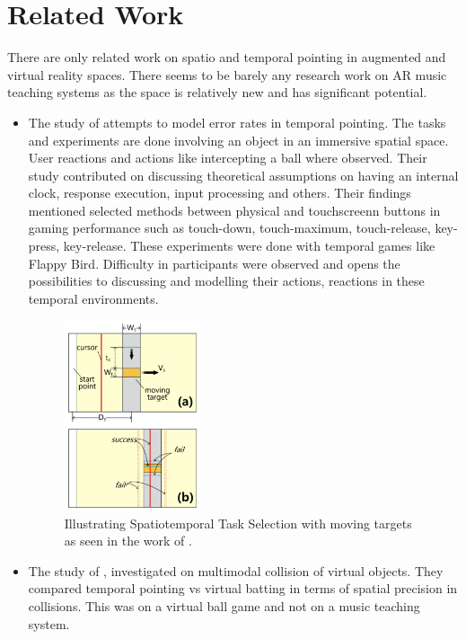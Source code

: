 \documentclass{article}
\begin{document}
\section{Related Work}
There are only related work on spatio and temporal pointing in augmented and virtual reality spaces. There seems to be barely any research work on AR music teaching systems as the space is relatively new and has significant potential.\\
\begin{itemize}
\item The study of \cite{lee2016modelling} attempts to model error rates in temporal pointing. The tasks and experiments are done involving an object in an immersive spatial space. User reactions and actions like intercepting a ball where observed. Their study contributed on discussing theoretical assumptions on having an internal clock, response execution, input processing and others. Their findings mentioned selected methods between physical and touchscreenn buttons in gaming performance such as touch-down, touch-maximum, touch-release, key-press, key-release. These experiments were done with temporal games like Flappy Bird. Difficulty in participants were observed and opens the possibilities to discussing and modelling their actions, reactions in these temporal environments.
\begin{figure}[t]
\centering
 \includegraphics[width=4cm]{figures/spatiotemporalmovingtargetselection.png}
    \caption{Illustrating Spatiotemporal Task Selection with moving targets as seen in the work of \cite{lee2016modelling}.
 }\label{fig:spatiotemporaltask}
\end{figure}
\item The study of \cite{lee2017boxer}, investigated on multimodal collision of virtual objects. They compared temporal pointing vs virtual batting in terms of spatial precision in collisions. This was on a virtual ball game and not on a music teaching system.


\end{itemize}
\end{document}

